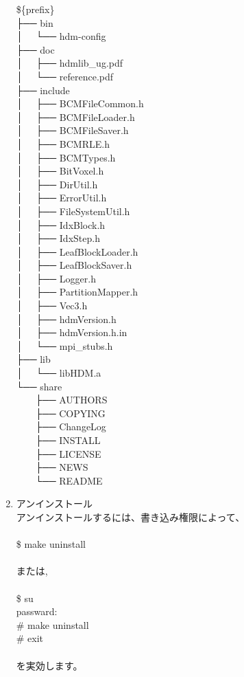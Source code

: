 \documentclass[twoside]{jbook}
\begin{document}
\begin{enumerate}
{\sf
\$\{prefix\} \\
├── bin \\
│   └── hdm-config \\
├── doc \\
│   ├── hdmlib\_ug.pdf \\
│   └── reference.pdf \\
├── include \\
│   ├── BCMFileCommon.h \\
│   ├── BCMFileLoader.h \\
│   ├── BCMFileSaver.h \\
│   ├── BCMRLE.h \\
│   ├── BCMTypes.h \\
│   ├── BitVoxel.h \\
│   ├── DirUtil.h \\
│   ├── ErrorUtil.h \\
│   ├── FileSystemUtil.h \\
│   ├── IdxBlock.h \\
│   ├── IdxStep.h \\
│   ├── LeafBlockLoader.h \\
│   ├── LeafBlockSaver.h \\
│   ├── Logger.h \\
│   ├── PartitionMapper.h \\
│   ├── Vec3.h \\
│   ├── hdmVersion.h \\
│   ├── hdmVersion.h.in \\
│   └── mpi\_stubs.h \\
├── lib \\
│   └── libHDM.a \\
└── share \\
　　├── AUTHORS \\
　　├── COPYING \\
　　├── ChangeLog \\
　　├── INSTALL \\
　　├── LICENSE \\
　　├── NEWS \\
　　└── README \\
}

\item アンインストール\\
アンインストールするには、書き込み権限によって、\\\\
{\sf
\$ make uninstall\\\\
}
または,\\\\
{\sf
\$ su\\
passward:\\
\# make uninstall\\
\# exit\\\\
}
を実効します。
\end{enumerate}
\end{document}
